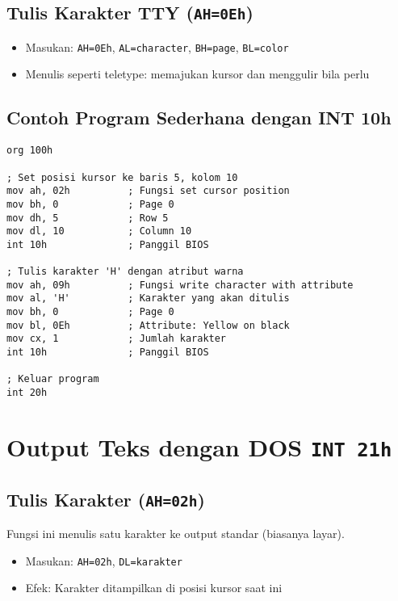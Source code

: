 \documentclass[../main.tex]{subfiles}
\begin{document}
        \subsection{Tulis Karakter TTY (\texttt{AH=0Eh})}
            \begin{itemize}
\item Masukan: \texttt{AH=0Eh}, \texttt{AL=character}, \texttt{BH=page}, \texttt{BL=color}
\item Menulis seperti teletype: memajukan kursor dan menggulir bila perlu
            \end{itemize}

        \subsection{Contoh Program Sederhana dengan INT 10h}
            \begin{lstlisting}[language={[x86masm]Assembler}, caption=Contoh Output Teks dengan BIOS INT 10h, label={lst:bios-text-output}]
org 100h

; Set posisi kursor ke baris 5, kolom 10
mov ah, 02h          ; Fungsi set cursor position
mov bh, 0            ; Page 0
mov dh, 5            ; Row 5
mov dl, 10           ; Column 10
int 10h              ; Panggil BIOS

; Tulis karakter 'H' dengan atribut warna
mov ah, 09h          ; Fungsi write character with attribute
mov al, 'H'          ; Karakter yang akan ditulis
mov bh, 0            ; Page 0
mov bl, 0Eh          ; Attribute: Yellow on black
mov cx, 1            ; Jumlah karakter
int 10h              ; Panggil BIOS

; Keluar program
int 20h
            \end{lstlisting}

    \section{Output Teks dengan DOS \texttt{INT 21h}}
        \subsection{Tulis Karakter (\texttt{AH=02h})}
            Fungsi ini menulis satu karakter ke output standar (biasanya layar).
            \begin{itemize}
\item Masukan: \texttt{AH=02h}, \texttt{DL=karakter}
\item Efek: Karakter ditampilkan di posisi kursor saat ini
            \end{itemize}
\end{document}
